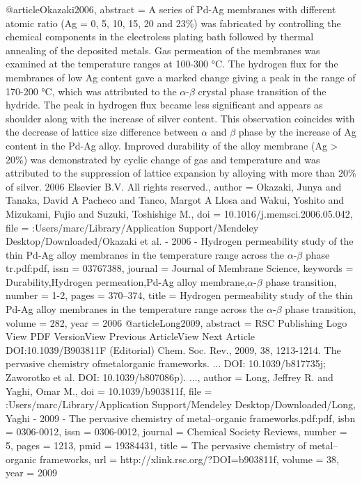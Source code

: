 @article{Okazaki2006,
abstract = {A series of Pd-Ag membranes with different atomic ratio (Ag = 0, 5, 10, 15, 20 and 23{\%}) was fabricated by controlling the chemical components in the electroless plating bath followed by thermal annealing of the deposited metals. Gas permeation of the membranes was examined at the temperature ranges at 100-300 °C. The hydrogen flux for the membranes of low Ag content gave a marked change giving a peak in the range of 170-200 °C, which was attributed to the $\alpha$-$\beta$ crystal phase transition of the hydride. The peak in hydrogen flux became less significant and appears as shoulder along with the increase of silver content. This observation coincides with the decrease of lattice size difference between $\alpha$ and $\beta$ phase by the increase of Ag content in the Pd-Ag alloy. Improved durability of the alloy membrane (Ag {\textgreater} 20{\%}) was demonstrated by cyclic change of gas and temperature and was attributed to the suppression of lattice expansion by alloying with more than 20{\%} of silver. {\textcopyright} 2006 Elsevier B.V. All rights reserved.},
author = {Okazaki, Junya and Tanaka, David A Pacheco and Tanco, Margot A Llosa and Wakui, Yoshito and Mizukami, Fujio and Suzuki, Toshishige M.},
doi = {10.1016/j.memsci.2006.05.042},
file = {:Users/marc/Library/Application Support/Mendeley Desktop/Downloaded/Okazaki et al. - 2006 - Hydrogen permeability study of the thin Pd-Ag alloy membranes in the temperature range across the $\alpha$-$\beta$ phase tr.pdf:pdf},
issn = {03767388},
journal = {Journal of Membrane Science},
keywords = {Durability,Hydrogen permeation,Pd-Ag alloy membrane,$\alpha$-$\beta$ phase transition},
number = {1-2},
pages = {370--374},
title = {{Hydrogen permeability study of the thin Pd-Ag alloy membranes in the temperature range across the $\alpha$-$\beta$ phase transition}},
volume = {282},
year = {2006}
}
@article{Long2009,
abstract = {RSC Publishing Logo View PDF VersionView Previous ArticleView Next Article DOI:10.1039/B903811F (Editorial) Chem. Soc. Rev., 2009, 38, 1213-1214. The pervasive chemistry ofmetalorganic frameworks. ... DOI: 10.1039/b817735j; Zaworotko et al. DOI: 10.1039/b807086p). ...},
author = {Long, Jeffrey R. and Yaghi, Omar M.},
doi = {10.1039/b903811f},
file = {:Users/marc/Library/Application Support/Mendeley Desktop/Downloaded/Long, Yaghi - 2009 - The pervasive chemistry of metal–organic frameworks.pdf:pdf},
isbn = {0306-0012},
issn = {0306-0012},
journal = {Chemical Society Reviews},
number = {5},
pages = {1213},
pmid = {19384431},
title = {{The pervasive chemistry of metal–organic frameworks}},
url = {http://xlink.rsc.org/?DOI=b903811f},
volume = {38},
year = {2009}
}
